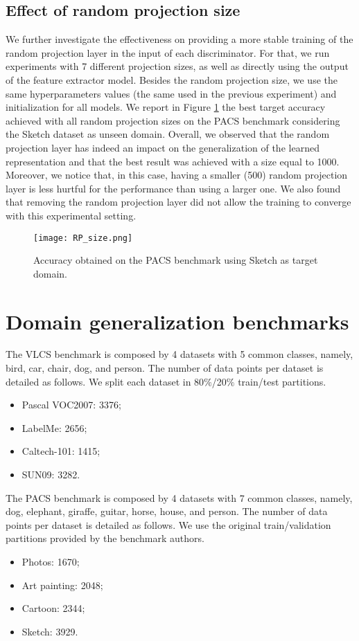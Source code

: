 \documentclass{article}
\begin{document}
\subsection{Effect of random projection size}
We further investigate the effectiveness on providing a more stable training of the random projection layer in the input of each discriminator. For that, we run experiments with 7 different projection sizes, as well as directly using the output of the feature extractor model. Besides the random projection size, we use the same hyperparameters values (the same used in the previous experiment) and initialization for all models. We report in Figure \ref{fig:res_rpsize} the best target accuracy achieved with all random projection sizes on the PACS benchmark considering the Sketch dataset as unseen domain. Overall, we observed that the random projection layer has indeed an impact on the generalization of the learned representation and that the best result was achieved with a size equal to 1000. Moreover, we notice that, in this case, having a smaller (500) random projection layer is less hurtful for the performance than using a larger one. We also found that removing the random projection layer did not allow the training to converge with this experimental setting.
\begin{figure}[h!]
    \centering
    \texttt{[image: RP\_size.png]}
    \caption{Accuracy obtained on the PACS benchmark using Sketch as target domain.}
    \label{fig:res_rpsize}
\end{figure}

\section{Domain generalization benchmarks}
The VLCS benchmark is composed by 4 datasets with 5 common classes, namely, bird, car, chair, dog, and person. The number of data points per dataset is detailed as follows. We split each dataset in 80$\%$/20$\%$ train/test partitions. 
\begin{itemize}
    \item Pascal VOC2007: 3376;
    \item LabelMe: 2656;
    \item Caltech-101: 1415;
    \item SUN09: 3282.
\end{itemize}
The PACS benchmark is composed by 4 datasets with 7 common classes, namely, dog, elephant, giraffe, guitar, horse, house, and person. The number of data points per dataset is detailed as follows. We use the original train/validation partitions provided by the benchmark authors.
\begin{itemize}
    \item Photos: 1670;
    \item Art painting: 2048;
    \item Cartoon: 2344;
    \item Sketch: 3929.
\end{itemize}
\end{document}
